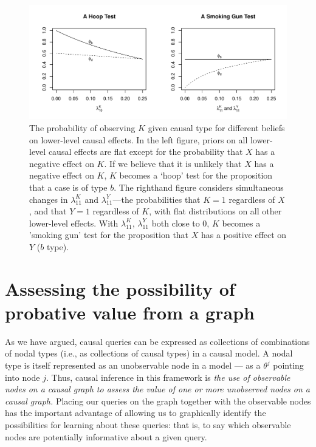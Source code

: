 \documentclass[
  12pt,
]{book}
\begin{document}
\begin{figure}

{\centering \includegraphics[width=.85\textwidth]{ii_files/figure-latex/phis-1} 

}

\caption{The probability of observing $K$ given causal type for different beliefs on lower-level causal effects. In the left figure, priors on all lower-level causal effects are flat except for the probability that $X$ has a negative effect on $K$. If we believe that it is unlikely that $X$ has a negative effect on $K$, $K$ becomes a `hoop' test for the proposition that a case is of type $b$. The righthand figure considers simultaneous changes in $\lambda_{11}^K$ and  $\lambda_{11}^Y$---the probabilities that $K=1$ regardless of $X$, and that $Y=1$  regardless of $K$, with flat distributions on all other lower-level effects. With $\lambda_{11}^K$, $\lambda_{11}^Y$ both close to 0, $K$ becomes a 'smoking gun' test for the proposition that $X$ has a positive effect on $Y$ ($b$ type).}\label{fig:phis}
\end{figure}

\hypertarget{assessing-the-possibility-of-probative-value-from-a-graph}{%
\section{Assessing the possibility of probative value from a graph}\label{assessing-the-possibility-of-probative-value-from-a-graph}}

As we have argued, causal queries can be expressed as collections of combinations of nodal types (i.e., as collections of causal types) in a causal model. A nodal type is itself represented as an unobservable node in a model --- as a \(\theta^j\) pointing into node \(j\). Thus, causal inference in this framework is \emph{the use of observable nodes on a causal graph to assess the value of one or more unobserved nodes on a causal graph.} Placing our queries on the graph together with the observable nodes has the important advantage of allowing us to graphically identify the possibilities for learning about these queries: that is, to say which observable nodes are potentially informative about a given query.
\end{document}
